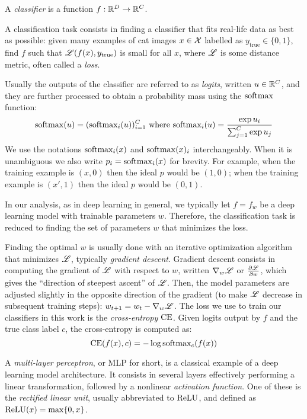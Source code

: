 \documentclass[../main.tex]{subfiles}
\begin{document}
A \emph{classifier} is a function $f: \mathbb{R}^D \to \mathbb{R}^C$.

A classification task consists in finding a classifier that fits real-life data as best as possible:
given many examples of cat images $x \in \mathcal{X}$ labelled as $y_\text{true} \in \{0, 1\}$, find $f$ such that
$\mathscr{L}(f(x), y_\text{true})$ is small for all $x$, where $\mathscr{L}$ is some distance metric, often called a \emph{loss}.

Usually the outputs of the classifier are referred to as \emph{logits}, written $u \in \mathbb{R}^C$,
and they are further processed to obtain a probability mass using the $\mathrm{softmax}$ function:
\begin{equation}
    \mathrm{softmax}(u) = (\mathrm{softmax}_i(u))_{i=1}^{C} \text{ where }
    \mathrm{softmax}_i(u) = \frac{\exp u_i}{\sum_{j=1}^{C} \exp u_j}
\end{equation}
We use the notations $\mathrm{softmax}_i(x)$ and $\mathrm{softmax}(x)_i$ interchangeably.
When it is unambiguous we also write $p_i = \mathrm{softmax}_i(x)$ for brevity.
For example, when the training example is $(x, 0)$ then the ideal $p$ would be $(1, 0)$;
when the training example is $(x', 1)$ then the ideal $p$ would be $(0, 1)$.

In our analysis, as in deep learning in general, we typically let $f = f_w$ be a deep learning model with trainable parameters $w$.
Therefore, the classification task is reduced to finding the set of parameters $w$ that minimizes
the loss.

Finding the optimal $w$ is usually done with an iterative optimization algorithm that minimizes $\mathscr{L}$, typically \emph{gradient descent}.
Gradient descent consists in computing the gradient of $\mathscr{L}$ with respect to $w$, written $\nabla_w \mathscr{L}$ or $\frac{\partial \mathscr{L}}{\partial w}$, which gives the ``direction of steepest ascent'' of $\mathscr{L}$.
Then, the model parameters are adjusted slightly in the opposite direction of the gradient (to make $\mathscr{L}$ decrease in subsequent training steps): $w_{t+1} = w_t - \nabla_w \mathscr{L}$.
The loss we use to train our classifiers in this work is the \emph{cross-entropy} $\text{CE}$.
Given logits output by $f$ and the true class label $c$, the cross-entropy is computed as:
\begin{equation}
\text{CE}(f(x), c) = - \log \mathrm{softmax}_c(f(x))
\end{equation}

A \emph{multi-layer perceptron}, or MLP for short, is a classical example of a deep learning model architecture.
It consists in several layers effectively performing a linear transformation, followed by a nonlinear \emph{activation function}.
One of these is the \emph{rectified linear unit}, usually abbreviated to $\text{ReLU}$, and defined as $\text{ReLU}(x) = \max\{0, x\}$.
\end{document}
